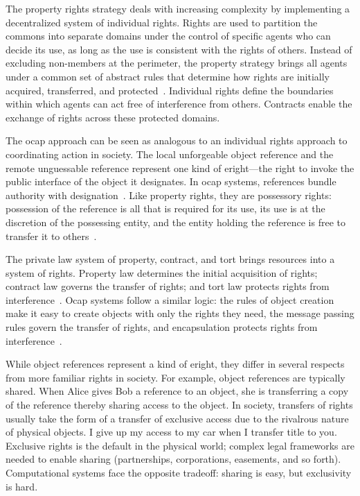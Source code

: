 \documentclass{llncs}
\begin{document}
The property rights strategy deals with increasing complexity by implementing a decentralized system of individual rights. Rights are used to partition the commons into separate domains under the control of specific agents who can decide its use, as long as the use is consistent with the rights of others. Instead of excluding non-members at the perimeter, the property strategy brings all agents under a common set of abstract rules that determine how rights are initially acquired, transferred, and protected~\cite{hayek_law_1973}. Individual rights define the boundaries within which agents can act free of interference from others. Contracts enable the exchange of rights across these protected domains.  

The ocap approach can be seen as analogous to an individual rights approach to coordinating action in society. The local unforgeable object reference and the remote unguessable reference represent one kind of eright---the right to invoke the public interface of the object it designates. In ocap systems, references bundle authority with designation~\cite{Hardy88Deputy}. Like property rights, they are possessory rights: possession of the reference is all that is required for its use, its use is at the discretion of the possessing entity, and the entity holding the reference is free to transfer it to others~\cite{mossoff_what_2003}.

The private law system of property, contract, and tort brings resources into a system of rights. Property law determines the initial acquisition of rights; contract law governs the transfer of rights; and tort law protects rights from interference~\cite{epstein_simple_1995}. Ocap systems follow a similar logic: the rules of object creation make it easy to create objects with only the rights they need, the message passing rules govern the transfer of rights, and encapsulation protects rights from interference~\cite{RobustComposition}.

While object references represent a kind of eright, they differ in several respects from more familiar rights in society. For example, object references are typically shared. When Alice gives Bob a reference to an object, she is transferring a copy of the reference thereby sharing access to the object. In society, transfers of rights usually take the form of a transfer of exclusive access due to the rivalrous nature of physical objects. I give up my access to my car when I transfer title to you. Exclusive rights is the default in the physical world; complex legal frameworks are needed to enable sharing (partnerships, corporations, easements, and so forth). Computational systems face the opposite tradeoff: sharing is easy, but exclusivity is hard.
\end{document}
